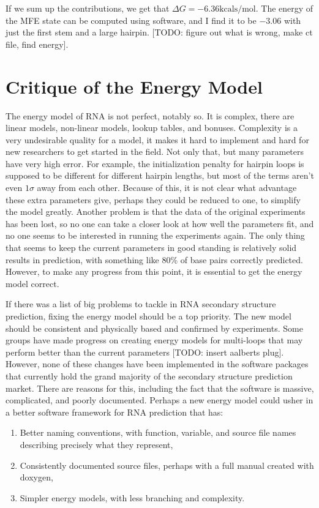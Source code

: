 If we sum up the contributions, we get that $\Delta G = -6.36 \text{
  kcals/mol}$. The energy of the MFE state can be computed using
software, and I find it to be $-3.06$ with just the first stem and a
large hairpin. [TODO: figure out what is wrong, make ct file, find energy].

\section{Critique of the Energy Model}

The energy model of RNA is not perfect, notably so. It is complex,
there are linear models, non-linear models, lookup tables, and
bonuses. Complexity is a very undesirable quality for a model, it
makes it hard to implement and hard for new researchers to get started
in the field.  Not only that, but many parameters have very high
error. For example, the initialization penalty for hairpin loops is
supposed to be different for different hairpin lengths, but most of
the terms aren't even $1\sigma$ away from each other. Because of this,
it is not clear what advantage these extra parameters give, perhaps
they could be reduced to one, to simplify the model greatly. Another
problem is that the data of the original experiments has been lost, so
no one can take a closer look at how well the parameters fit, and no
one seems to be interested in running the experiments again. The only
thing that seems to keep the current parameters in good standing is
relatively solid results in prediction, with something like 80\% of
base pairs correctly predicted. However, to make any progress from
this point, it is essential to get the energy model correct. 

If there was a list of big problems to tackle in RNA secondary
structure prediction, fixing the energy model should be a top
priority. The new model should be consistent and physically based and
confirmed by experiments. Some groups have made progress on creating
energy models for multi-loops that may perform better than the current
parameters [TODO: insert aalberts plug]. However, none of these
changes have been implemented in the software packages that currently
hold the grand majority of the secondary structure prediction
market. There are reasons for this, including the fact that the
software is massive, complicated, and poorly documented. Perhaps a new
energy model could usher in a better software framework for RNA
prediction that has:

\begin{enumerate}
\item Better naming conventions, with function, variable, and source
  file names describing precisely what they represent,
\item Consistently documented source files, perhaps with a full manual
  created with doxygen,  
\item Simpler energy models, with less branching and complexity.
\end{enumerate}

